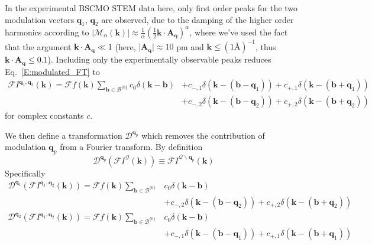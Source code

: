 \documentclass[12pt]{article}
\begin{document}
In the experimental BSCMO STEM data here, only first order peaks for the two modulation vectors $\mathbf{q}_1$, $\mathbf{q}_2$ are observed, due to the damping of the higher order harmonics according to $\lvert\mathcal{M}_{\alpha}(\mathbf{k})\rvert \approx \frac{1}{\alpha}\left(\frac{1}{2}\mathbf{k}\cdot\mathbf{A}_\mathbf{q}\right)^\alpha$, where we've used the fact that the argument $\mathbf{k}\cdot\mathbf{A}_\mathbf{q} \ll 1$ (here, $\lvert\mathbf{A}_\mathbf{q}\rvert\approx 10$ pm and $\mathbf{k}\leq (1\text{\AA})^{-1}$, thus $\mathbf{k}\cdot\mathbf{A}_\mathbf{q} \leq 0.1$).
Including only the experimentally observable peaks reduces Eq.~\ref{E:modulated_FT} to
\begin{align}\label{E:simplified_FT}
    \mathcal{F}I^{\mathbf{q}_1,\mathbf{q}_2}(\mathbf{k}) =
        \mathcal{F}f(\mathbf{k}) \sum_{\mathbf{b}\in\mathcal{B}^{\{0\}}}
        c_0\delta\left(\mathbf{k}-\mathbf{b}\right) &+ c_{-,1}\delta\left(\mathbf{k}-\left(\mathbf{b}-\mathbf{q}_1\right)\right) + c_{+,1}\delta\left(\mathbf{k}-\left(\mathbf{b}+\mathbf{q}_1\right)\right)\nonumber\\
        &+ c_{-,2}\delta\left(\mathbf{k}-\left(\mathbf{b}-\mathbf{q}_2\right)\right) + c_{+,2}\delta\left(\mathbf{k}-\left(\mathbf{b}+\mathbf{q}_2\right)\right)
\end{align}
for complex constants $c$.

We then define a transformation $\mathcal{D}^{\mathbf{q}_p}$ which removes the contribution of modulation $\mathbf{q}_p$ from a Fourier transform.
By definition
\begin{equation*}
    \mathcal{D}^{\mathbf{q}_p}\left(\mathcal{F}I^{\mathcal{Q}}(\mathbf{k})\right) \equiv \mathcal{F}I^{\mathcal{Q}\backslash\mathbf{q}_p}(\mathbf{k})
\end{equation*}
Specifically
\begin{align*}			
	\mathcal{D}^{\mathbf{q}_1}\left(\mathcal{F}I^{\mathbf{q}_1,\mathbf{q}_2}(\mathbf{k})\right) = \mathcal{F}f(\mathbf{k}) \sum_{\mathbf{b}\in\mathcal{B}^{\{0\}}}
        &c_0\delta\left(\mathbf{k}-\mathbf{b}\right)\\ 
        &+ c_{-,2}\delta\left(\mathbf{k}-\left(\mathbf{b}-\mathbf{q}_2\right)\right) + c_{+,2}\delta\left(\mathbf{k}-\left(\mathbf{b}+\mathbf{q}_2\right)\right)\\
\mathcal{D}^{\mathbf{q}_2}\left(\mathcal{F}I^{\mathbf{q}_1,\mathbf{q}_2}(\mathbf{k})\right) = \mathcal{F}f(\mathbf{k}) \sum_{\mathbf{b}\in\mathcal{B}^{\{0\}}}
        &c_0\delta\left(\mathbf{k}-\mathbf{b}\right)\\ 
        &+ c_{-,1}\delta\left(\mathbf{k}-\left(\mathbf{b}-\mathbf{q}_1\right)\right) + c_{+,1}\delta\left(\mathbf{k}-\left(\mathbf{b}+\mathbf{q}_1\right)\right)
\end{align*}
\end{document}
